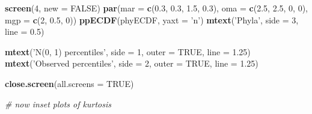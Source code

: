 \documentclass[]{article}
\newenvironment{Shaded}{\begin{snugshade}}{\end{snugshade}}
\newcommand{\KeywordTok}[1]{\textcolor[rgb]{0.13,0.29,0.53}{\textbf{#1}}}
\newcommand{\DataTypeTok}[1]{\textcolor[rgb]{0.13,0.29,0.53}{#1}}
\newcommand{\DecValTok}[1]{\textcolor[rgb]{0.00,0.00,0.81}{#1}}
\newcommand{\FloatTok}[1]{\textcolor[rgb]{0.00,0.00,0.81}{#1}}
\newcommand{\StringTok}[1]{\textcolor[rgb]{0.31,0.60,0.02}{#1}}
\newcommand{\CommentTok}[1]{\textcolor[rgb]{0.56,0.35,0.01}{\textit{#1}}}
\newcommand{\OtherTok}[1]{\textcolor[rgb]{0.56,0.35,0.01}{#1}}
\newcommand{\NormalTok}[1]{#1}
\begin{document}
\begin{Shaded}
\begin{Highlighting}[]
\KeywordTok{screen}\NormalTok{(}\DecValTok{4}\NormalTok{, }\DataTypeTok{new =} \OtherTok{FALSE}\NormalTok{)}
\KeywordTok{par}\NormalTok{(}\DataTypeTok{mar =} \KeywordTok{c}\NormalTok{(}\FloatTok{0.3}\NormalTok{, }\FloatTok{0.3}\NormalTok{, }\FloatTok{1.5}\NormalTok{, }\FloatTok{0.3}\NormalTok{), }\DataTypeTok{oma =} \KeywordTok{c}\NormalTok{(}\FloatTok{2.5}\NormalTok{, }\FloatTok{2.5}\NormalTok{, }\DecValTok{0}\NormalTok{, }\DecValTok{0}\NormalTok{), }
    \DataTypeTok{mgp =} \KeywordTok{c}\NormalTok{(}\DecValTok{2}\NormalTok{, }\FloatTok{0.5}\NormalTok{, }\DecValTok{0}\NormalTok{))}
\KeywordTok{ppECDF}\NormalTok{(phyECDF, }\DataTypeTok{yaxt =} \StringTok{'n'}\NormalTok{)}
\KeywordTok{mtext}\NormalTok{(}\StringTok{'Phyla'}\NormalTok{, }\DataTypeTok{side =} \DecValTok{3}\NormalTok{, }\DataTypeTok{line =} \FloatTok{0.5}\NormalTok{)}


\KeywordTok{mtext}\NormalTok{(}\StringTok{'N(0, 1) percentiles'}\NormalTok{, }\DataTypeTok{side =} \DecValTok{1}\NormalTok{, }\DataTypeTok{outer =} \OtherTok{TRUE}\NormalTok{, }\DataTypeTok{line =} \FloatTok{1.25}\NormalTok{)}
\KeywordTok{mtext}\NormalTok{(}\StringTok{'Observed percentiles'}\NormalTok{, }\DataTypeTok{side =} \DecValTok{2}\NormalTok{, }\DataTypeTok{outer =} \OtherTok{TRUE}\NormalTok{, }\DataTypeTok{line =} \FloatTok{1.25}\NormalTok{)}

\KeywordTok{close.screen}\NormalTok{(}\DataTypeTok{all.screens =} \OtherTok{TRUE}\NormalTok{)}


\CommentTok{# now inset plots of kurtosis}


\end{Highlighting}
\end{Shaded}
\end{document}
